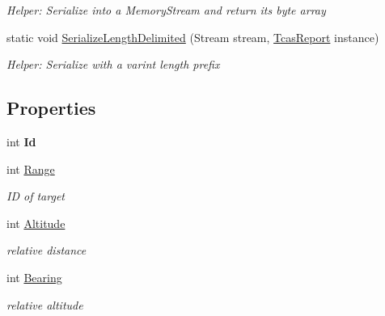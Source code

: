 \begin{DoxyCompactItemize}
\begin{DoxyCompactList}\small\item\em Helper\+: Serialize into a Memory\+Stream and return its byte array\end{DoxyCompactList}\item 
static void \hyperlink{class_example_1_1_tcas_report_a65c3a0268ceb68df8be04522cbadd029}{Serialize\+Length\+Delimited} (Stream stream, \hyperlink{class_example_1_1_tcas_report}{Tcas\+Report} instance)
\begin{DoxyCompactList}\small\item\em Helper\+: Serialize with a varint length prefix\end{DoxyCompactList}\end{DoxyCompactItemize}
\subsection*{Properties}
\begin{DoxyCompactItemize}
\item 
\hypertarget{class_example_1_1_tcas_report_abae87180b605bd602950494bb76e7f56}{}int {\bfseries Id}\label{class_example_1_1_tcas_report_abae87180b605bd602950494bb76e7f56}

\item 
int \hyperlink{class_example_1_1_tcas_report_a32691ce0bb3b627f44655cf3013f5f20}{Range}
\begin{DoxyCompactList}\small\item\em I\+D of target\end{DoxyCompactList}\item 
int \hyperlink{class_example_1_1_tcas_report_a88be13f8636f9e7902c325ec73a150f8}{Altitude}
\begin{DoxyCompactList}\small\item\em relative distance\end{DoxyCompactList}\item 
int \hyperlink{class_example_1_1_tcas_report_a12eb2351e84f8e2830223829fde681ad}{Bearing}
\begin{DoxyCompactList}\small\item\em relative altitude\end{DoxyCompactList}\end{DoxyCompactItemize}


